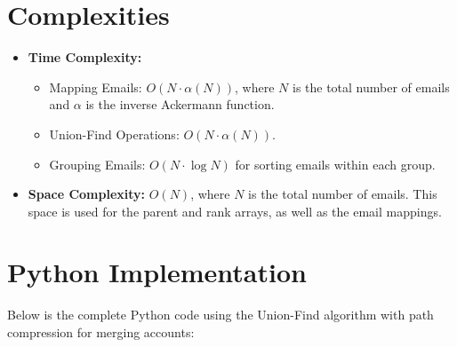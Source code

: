
\section*{Complexities}

\begin{itemize}
    \item \textbf{Time Complexity:}
    \begin{itemize}
        \item Mapping Emails: \(O(N \cdot \alpha(N))\), where \(N\) is the total number of emails and \(\alpha\) is the inverse Ackermann function.
        \item Union-Find Operations: \(O(N \cdot \alpha(N))\).
        \item Grouping Emails: \(O(N \cdot \log N)\) for sorting emails within each group.
    \end{itemize}
    \item \textbf{Space Complexity:} \(O(N)\), where \(N\) is the total number of emails. This space is used for the parent and rank arrays, as well as the email mappings.
\end{itemize}

\section*{Python Implementation}


Below is the complete Python code using the Union-Find algorithm with path compression for merging accounts:

